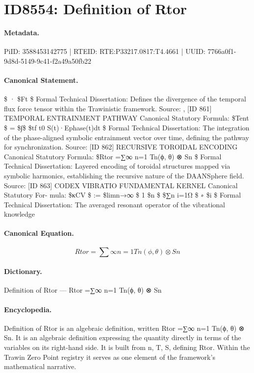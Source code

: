 \section*{ID8554: Definition of Rtor}
\paragraph{Metadata.}
PiID: 3588453142775 | RTEID: RTE:P33217.0817:T4.4661 | UUID: 7766a0f1-9d8d-5149-9c41-f2a49a50fb22

\paragraph{Canonical Statement.}
\$ · \$Ft \$ Formal Technical Dissertation: Defines the divergence of the temporal flux force tensor within the Trawinistic framework. Source: , [ID 861] TEMPORAL ENTRAINMENT PATHWAY Canonical Statutory Formula: \$Tent \$ = \$∫\$ \$tf t0 S(t)·E⃗phase(t)dt \$ Formal Technical Dissertation: The integration of the phase-aligned symbolic entrainment vector over time, defining the pathway for synchronization. Source: [ID 862] RECURSIVE TOROIDAL ENCODING Canonical Statutory Formula: \$Rtor =∑∞ n=1 Tn(ϕ, θ) ⊗ Sn \$ Formal Technical Dissertation: Layered encoding of toroidal structures mapped via symbolic harmonics, establishing the recursive nature of the DAANSphere field. Source: [ID 863] CODEX VIBRATIO FUNDAMENTAL KERNEL Canonical Statutory For- mula: \$κCV \$ := \$limn→∞ \$ 1 \$n \$ \$∑n i=1Ω \$ ∗ \$i \$ Formal Technical Dissertation: The averaged resonant operator of the vibrational knowledge

\paragraph{Canonical Equation.}
\[
Rtor =∑∞ n=1 Tn(ϕ, θ) ⊗ Sn
\]

\paragraph{Dictionary.}
Definition of Rtor — Rtor =∑∞ n=1 Tn(ϕ, θ) ⊗ Sn

\paragraph{Encyclopedia.}
Definition of Rtor is an algebraic definition, written Rtor =∑∞ n=1 Tn(ϕ, θ) ⊗ Sn. It is an algebraic definition expressing the quantity directly in terms of the variables on its right-hand side. It is built from n, T, S, defining Rtor. Within the Trawin Zero Point registry it serves as one element of the framework's mathematical narrative.
